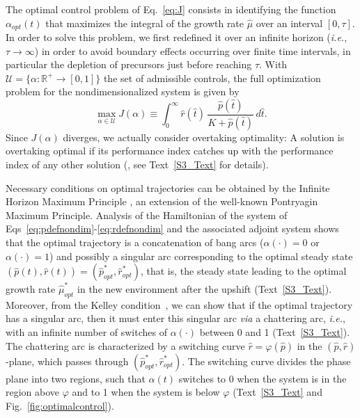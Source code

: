\documentclass[10pt,letterpaper]{article}
\begin{document}
{The optimal control problem of Eq.~\ref{eq:J} consists in identifying the function $\alpha_{opt}(t)$ that maximizes the integral of the growth rate $\hat{\mu}$ over an interval $[0, \tau]$.
In order to solve this problem, we first redefined it over an infinite horizon (\textit{i.e.}, $\tau \rightarrow \infty $) in order to avoid boundary effects occurring over finite time intervals, in particular the depletion of precursors just before reaching $\tau$.
With $\mathcal{U}=\{\alpha:\mathbb{R}^+ \rightarrow [0,1] \}$ the set of admissible controls, the full optimization problem for the nondimensionalized system is given by
\begin{equation}\label{eq:meth_prob}
\max_{\alpha \in \mathcal{U}} J(\alpha)\equiv \int_0^{\infty} \hat{r}(\hat{t}) \, \dfrac{\hat{p}(\hat{t})}{K+\hat{p}(\hat{t})}\, d\hat{t}.
\end{equation}
Since $J(\alpha)$ diverges, we actually consider overtaking optimality:
A solution is overtaking optimal if its performance index catches up with the performance index of any other solution (\cite{carlson_infinite_1991}, see Text~\ref{S3_Text} for details).

Necessary conditions on optimal trajectories can be obtained by the Infinite Horizon Maximum Principle \cite{carlson_infinite_1991}, an extension of the well-known Pontryagin Maximum Principle.
Analysis of the Hamiltonian of the system of Eqs~\ref{eq:pdefnondim}-\ref{eq:rdefnondim} and the associated adjoint system shows that the optimal trajectory is a concatenation of bang arcs ($\alpha(\cdot)=0$ or $\alpha(\cdot)=1$) and possibly a singular arc corresponding to the optimal steady state $(\hat{p}(t),\hat{r}(t))=(\hat{p}_{opt}^*,\hat{r}_{opt}^*)$, that is, the steady state leading to the optimal growth rate $\hat{\mu}_{opt}^*$ in the new environment after the upshift (Text~\ref{S3_Text}).
Moreover, from the Kelley condition~\cite{borisov_fullers_2000}, we can show that if the optimal trajectory has a singular arc, then it must enter this singular arc \textit{via} a chattering arc, \textit{i.e.}, with an infinite number of switches of $\alpha (\cdot)$ between 0 and 1 (Text~\ref{S3_Text}).
The chattering arc is characterized by a switching curve $\hat{r}=\varphi(\hat{p})$ in the $(\hat{p},\hat{r})$-plane, which passes through $(\hat{p}_{opt}^*,\hat{r}_{opt}^*)$.
The switching curve divides the phase plane into two regions, such that $\alpha(t)$ switches to 0 when the system is in the region above $\varphi$ and to 1 when the system is below $\varphi$ (Text~\ref{S3_Text} and Fig.~\ref{fig:optimalcontrol}).

}
\end{document}
